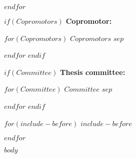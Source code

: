 \documentclass[$for(classoption)$$classoption$$sep$,$endfor$,twoside,openright]{book}
\begin{document}
\begin{titlepage}
\begin{spacing}{0}
    $endfor$

    \vspace{.5cm}

    $if(Copromotors)$
        \textbf{Copromotor:}

        $for(Copromotors)$
            \hspace{.5cm}
            $Copromotors$
            $sep$

        $endfor$
    $endif$

    $if(Committee)$
        \textbf{Thesis committee:}

        $for(Committee)$
            \hspace{.5cm}
            $Committee$
            $sep$

        $endfor$
    $endif$
    \end{spacing}
\end{titlepage}

$for(include-before)$
$include-before$

$endfor$

$body$
\end{document}
